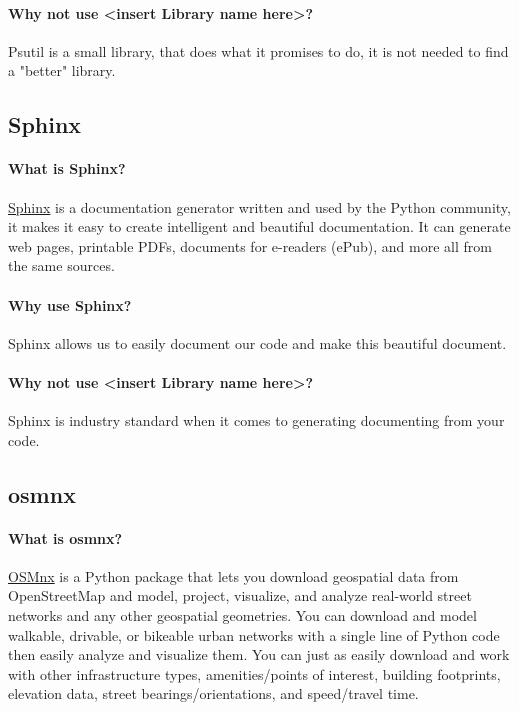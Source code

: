 \documentclass[parskip=full]{report} %
\begin{document}
\paragraph{Why not use <insert Library name here>?}
Psutil is a small  library, that does what it promises to do, it is not needed to find a "better" library.

\subsection{Sphinx}

\paragraph{What is Sphinx?}
\href{https://www.sphinx-doc.org/en/master/}{Sphinx} is a documentation generator written and used by the Python community, it makes it easy to create intelligent and beautiful documentation.
It can generate web pages, printable PDFs, documents for e-readers (ePub), and more all from the same sources.

\paragraph{Why use Sphinx?}
Sphinx allows us to easily document our code and make this beautiful document.

\paragraph{Why not use <insert Library name here>?}
Sphinx is industry standard when it comes to generating documenting from your code.

\subsection{osmnx}

\paragraph{What is osmnx?}
\href{https://osmnx.readthedocs.io/en/stable/}{OSMnx} is a Python package that lets you download geospatial data from OpenStreetMap and model, project, visualize, and analyze real-world street networks and any other geospatial geometries. You can download and model walkable, drivable, or bikeable urban networks with a single line of Python code then easily analyze and visualize them. You can just as easily download and work with other infrastructure types, amenities/points of interest, building footprints, elevation data, street bearings/orientations, and speed/travel time.
\end{document}
